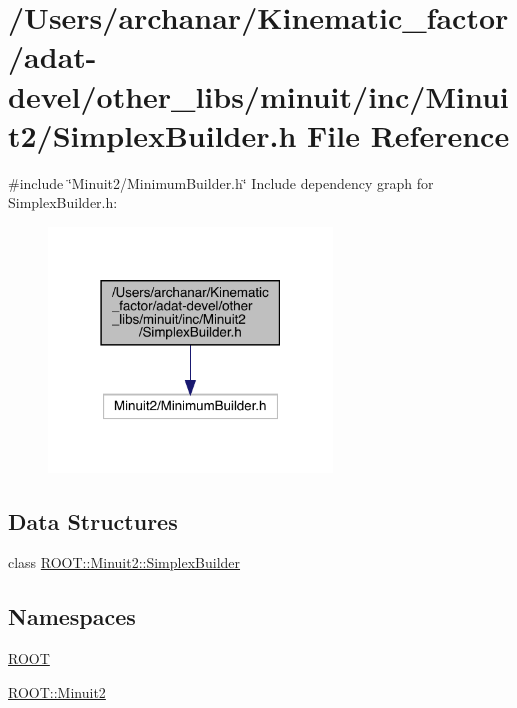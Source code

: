 \hypertarget{adat-devel_2other__libs_2minuit_2inc_2Minuit2_2SimplexBuilder_8h}{}\section{/\+Users/archanar/\+Kinematic\+\_\+factor/adat-\/devel/other\+\_\+libs/minuit/inc/\+Minuit2/\+Simplex\+Builder.h File Reference}
\label{adat-devel_2other__libs_2minuit_2inc_2Minuit2_2SimplexBuilder_8h}
{\ttfamily \#include \char`\"{}Minuit2/\+Minimum\+Builder.\+h\char`\"{}}\newline
Include dependency graph for Simplex\+Builder.\+h\+:
\nopagebreak
\begin{figure}[H]
\begin{center}
\leavevmode
\includegraphics[width=214pt]{d9/d2d/adat-devel_2other__libs_2minuit_2inc_2Minuit2_2SimplexBuilder_8h__incl}
\end{center}
\end{figure}
\subsection*{Data Structures}
\begin{DoxyCompactItemize}
\item 
class \mbox{\hyperlink{classROOT_1_1Minuit2_1_1SimplexBuilder}{R\+O\+O\+T\+::\+Minuit2\+::\+Simplex\+Builder}}
\end{DoxyCompactItemize}
\subsection*{Namespaces}
\begin{DoxyCompactItemize}
\item 
 \mbox{\hyperlink{namespaceROOT}{R\+O\+OT}}
\item 
 \mbox{\hyperlink{namespaceROOT_1_1Minuit2}{R\+O\+O\+T\+::\+Minuit2}}
\end{DoxyCompactItemize}
